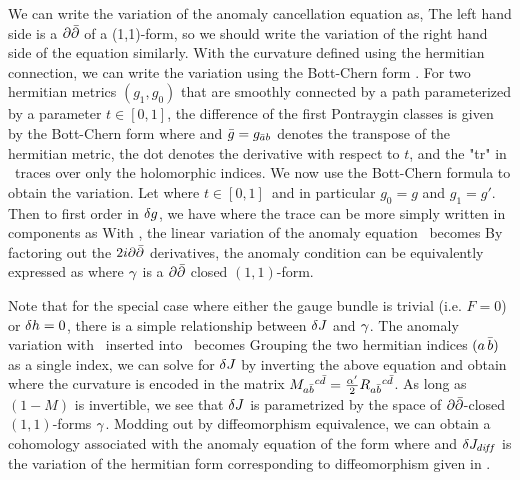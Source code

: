 We can write the variation of the anomaly cancellation equation
as, \eqn{} The left
hand side is a $\partial{\bar \partial}$ of a (1,1)-form, so we should write the
variation of the right hand side of the equation similarly.  With
the curvature defined using the hermitian connection, we can write
the variation using the Bott-Chern form . For two
hermitian metrics $(g_1, g_0)$ that are smoothly connected by a
path parameterized by a parameter $t\in [0,1]$, the difference of
the first Pontraygin classes is given by the Bott-Chern form
\eqn{} where \eqn{}
and ${\bar g}=g_{{\bar a} b}$ denotes the transpose of the hermitian metric, the
dot denotes the derivative with respect to $t$, and the "tr" in
\bcform\ traces over only the holomorphic indices. We now use the Bott-Chern formula to obtain the variation.
Let \eqn{} where $t\in
[0,1]\,$ and in particular $g_0=g$ and $g_1=g'$. Then to first
order in $\delta g$, we have
\eqn{}
where the trace can be more simply written in components as
\eqn{} With \rrvar, the linear variation
of the anomaly equation \anomvar\ becomes
\eqn{}
By factoring out the $2i\partial{\bar \partial}$ derivatives, the anomaly condition
can be equivalently expressed as
\eqn{}
where $\gamma$ is a $\partial{\bar \partial}$ closed $(1,1)$-form.

Note that for the special case where either the gauge bundle is
trivial (i.e. $F=0$) or $\delta h=0$, there is a simple relationship
between $\delta J$ and $\gamma$.  The anomaly variation with \tracrel\
inserted into \anomv\ becomes
\eqn{}
Grouping the two hermitian indices $(a\,{\bar b})$ as a single index, we can
solve for $\delta J$ by inverting the above equation and obtain
\eqn{} where the curvature is
encoded in the matrix $M_{a{\bar b}}{}^{c{\bar d}}={\alpha' \over 2}
R_{a{\bar b}}{}^{c{\bar d}}$. As long as $(1 - M)$ is invertible, we see
that $\delta J$ is parametrized by the space of $\partial{\bar \partial}$-closed
$(1,1)$-forms $\gamma$. Modding out by diffeomorphism equivalence, we
can obtain a cohomology associated with the anomaly equation of
the form
\eqn{}
where
\eqn{}
and $\delta J_{di\!f\!f}$ is the variation of the hermitian form
corresponding to diffeomorphism given in \Jdiffeo.


